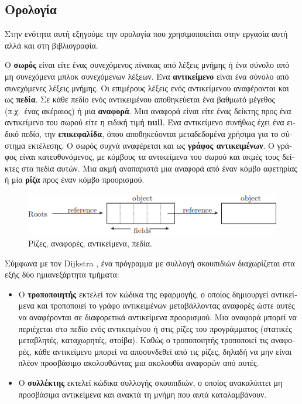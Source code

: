 \begin{greek}
\section{Ορολογία}
Στην ενότητα αυτή εξηγούμε την ορολογία που χρησιμοποιείται
στην εργασία αυτή αλλά και στη βιβλιογραφία.

Ο \textbf{σωρός} είναι είτε ένας συνεχόμενος πίνακας από λέξεις
μνήμης ή ένα σύνολο από μη συνεχόμενα μπλοκ συνεχόμενων λέξεων.
Ένα \textbf{αντικείμενο} είναι ένα σύνολο από συνεχόμενες λέξεις
μνήμης. Οι επιμέρους λέξεις ενός αντικείμενου αναφέρονται και ως
\textbf{πεδία}. Σε κάθε πεδίο ενός αντικειμένου αποθηκεύεται ένα
βαθμωτό μέγεθος (π.χ.\ ένας ακέραιος) ή μια \textbf{αναφορά}. Μια
αναφορά είναι είτε ένας δείκτης προς ένα αντικείμενο του σωρού
είτε η ειδική τιμή \textbf{null}. Ένα αντικείμενο συνήθως έχει
ένα ειδικό πεδίο, την \textbf{επικεφαλίδα}, όπου αποθηκεύονται
μεταδεδομένα χρήσιμα για το σύστημα εκτέλεσης. Ο σωρός συχνά
αναφέρεται και ως \textbf{γράφος αντικειμένων}. Ο γράφος είναι
κατευθυνόμενος, με κόμβους τα αντικείμενα του σωρού και ακμές
τους δείκτες στα πεδία αυτών. Μια ακμή αναπαριστά μια αναφορά από
έναν κόμβο αφετηρίας ή μία \textbf{ρίζα} προς έναν κόμβο προορισμού.

\begin{figure}[H]
 \centering
 \includegraphics{figures/intro_3}
 \caption{Ρίζες, αναφορές, αντικείμενα, πεδία.}
 \label{fig:intro_3}
\end{figure}
 
Σύμφωνα με τον Dijkstra \cite{DBLP:conf/ac/DijkstraLMSS75,
DBLP:journals/cacm/DijkstraLMSS78}, ένα πρόγραμμα με συλλογή
σκουπιδιών διαχωρίζεται στα εξής δύο ημιανεξάρτητα τμήματα:

\begin{itemize}
\item Ο \textbf{τροποποιητής} εκτελεί τον κώδικα της εφαρμογής,
      ο οποίος δημιουργεί αντικείμενα και τροποποιεί το γράφο
      αντικειμένων μεταβάλλοντας αναφορές ώστε αυτές να αναφέρονται
      σε διαφορετικά αντικείμενα προορισμού. Μια αναφορά μπορεί
      να περιέχεται στο πεδίο ενός αντικειμένου ή στις ρίζες
      του προγράμματος (στατικές μεταβλητές, καταχωρητές, στοίβα).
      Καθώς ο τροποποιητής τροποποιεί τις αναφορές, κάθε αντικείμενο
      μπορεί να αποσυνδεθεί από τις ρίζες, δηλαδή να μην είναι
      πλέον προσβάσιμο ακολουθώντας μια ακολουθία αναφορών από
      αυτές.
\item Ο \textbf{συλλέκτης} εκτελεί κώδικα συλλογής σκουπιδιών,
      ο οποίος ανακαλύπτει μη προσβάσιμα αντικείμενα και ανακτά
      τη μνήμη που αυτά καταλαμβάνουν.
\end{itemize}


\end{greek}
